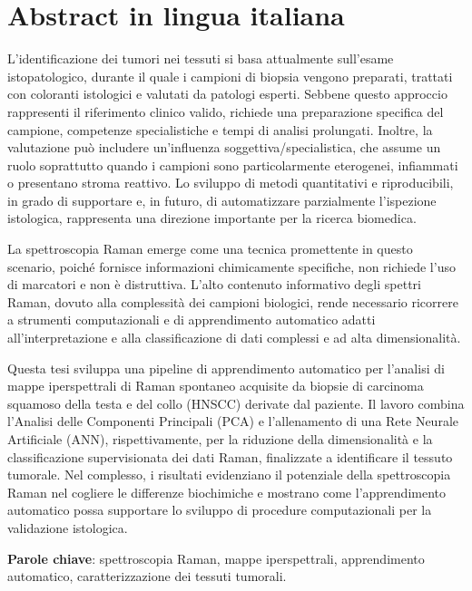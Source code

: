 \chapter*{Abstract in lingua italiana}


L'identificazione dei tumori nei tessuti si basa attualmente sull'esame istopatologico, durante il quale i campioni di biopsia vengono preparati, trattati con coloranti istologici e valutati da patologi esperti. Sebbene questo approccio rappresenti il riferimento clinico valido, richiede una preparazione specifica del campione, competenze specialistiche e tempi di analisi prolungati. Inoltre, la valutazione può includere un'influenza soggettiva/specialistica, che assume un ruolo soprattutto quando i campioni sono particolarmente eterogenei, infiammati o presentano stroma reattivo. Lo sviluppo di metodi quantitativi e riproducibili, in grado di supportare e, in futuro, di automatizzare parzialmente l'ispezione istologica, rappresenta una direzione importante per la ricerca biomedica.

 La spettroscopia Raman emerge come una tecnica promettente in questo scenario, poiché fornisce informazioni chimicamente specifiche, non richiede l'uso di marcatori e non è distruttiva. L'alto contenuto informativo degli spettri Raman, dovuto alla complessità dei campioni biologici, rende necessario ricorrere a strumenti computazionali e di apprendimento automatico adatti all'interpretazione e alla classificazione di dati complessi e ad alta dimensionalità. 
 
 Questa tesi sviluppa una pipeline di apprendimento automatico per l'analisi di mappe iperspettrali di Raman spontaneo acquisite da biopsie di carcinoma squamoso della testa e del collo (HNSCC) derivate dal paziente. Il lavoro combina l'Analisi delle Componenti Principali (PCA) e l'allenamento di una Rete Neurale Artificiale (ANN), rispettivamente, per la riduzione della dimensionalità e la classificazione supervisionata dei dati Raman, finalizzate a identificare il tessuto tumorale. Nel complesso, i risultati evidenziano il potenziale della spettroscopia Raman nel cogliere le differenze biochimiche e mostrano come l'apprendimento automatico possa supportare lo sviluppo di procedure computazionali per la validazione istologica.

\vspace{1em}
\noindent\textbf{Parole chiave}: spettroscopia Raman, mappe iperspettrali, apprendimento automatico, caratterizzazione dei tessuti tumorali.